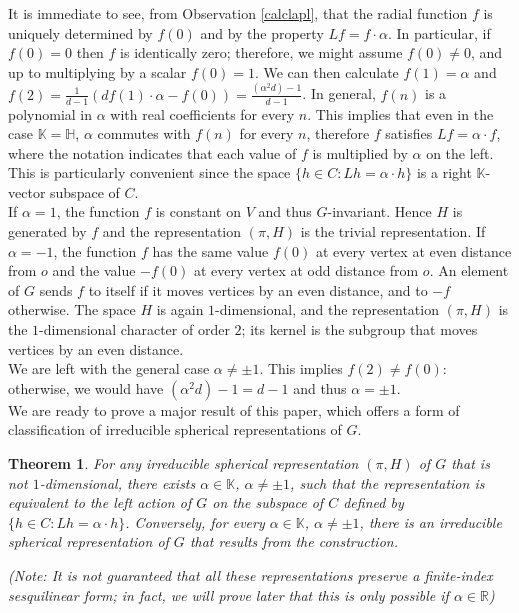 \documentclass{article}
\theoremstyle{definition}
\theoremstyle{remark}
\theoremstyle{plain}
\newtheorem{thm}[dfn]{Theorem}
\begin{document}
It is immediate to see, from Observation \ref{calclapl}, that the radial function $f$ is uniquely determined by $f(0)$ and by the property $Lf=f\cdot\alpha$. In particular, if $f(0)=0$ then $f$ is identically zero; therefore, we might assume $f(0)\neq 0$, and up to multiplying by a scalar $f(0)=1$. We can then calculate $f(1)=\alpha$ and $f(2)=\frac{1}{d-1}(df(1)\cdot\alpha-f(0))=\frac{(\alpha^2 d)-1}{d-1}$. In general, $f(n)$ is a polynomial in $\alpha$ with real coefficients for every $n$. This implies that even in the case $\mathbb{K}=\mathbb{H}$, $\alpha$ commutes with $f(n)$ for every $n$, therefore $f$ satisfies $Lf=\alpha\cdot f$, where the notation indicates that each value of $f$ is multiplied by $\alpha$ on the left. This is particularly convenient since the space $\{h\in C: Lh=\alpha\cdot h\}$ is a right $\mathbb{K}$-vector subspace of $C$.\\

If $\alpha=1$, the function $f$ is constant on $V$ and thus $G$-invariant. Hence $H$ is generated by $f$ and the representation $(\pi,H)$ is the trivial representation. If $\alpha=-1$, the function $f$ has the same value $f(0)$ at every vertex at even distance from $o$ and the value $-f(0)$ at every vertex at odd distance from $o$. An element of $G$ sends $f$ to itself if it moves vertices by an even distance, and to $-f$ otherwise. The space $H$ is again $1$-dimensional, and the representation $(\pi,H)$ is the $1$-dimensional character of order $2$; its kernel is the subgroup that moves vertices by an even distance. \\

We are left with the general case $\alpha\neq\pm 1$. This implies $f(2)\neq f(0)$: otherwise, we would have $(\alpha ^2 d)-1=d-1$ and thus $\alpha=\pm 1$. \\

We are ready to prove a major result of this paper, which offers a form of classification of irreducible spherical representations of $G$. \\

\begin{thm} \label{sph}
For any irreducible spherical representation $(\pi,H)$ of $G$ that is not $1$-dimensional, there exists $\alpha\in\mathbb{K}$, $\alpha\neq\pm 1$, such that the representation is equivalent to the left action of $G$ on the subspace of $C$ defined by $\{h\in C: Lh=\alpha\cdot h\}$. Conversely, for every $\alpha\in\mathbb{K}$, $\alpha\neq\pm 1$, there is an irreducible spherical representation of $G$ that results from the construction.

(Note: It is not guaranteed that all these representations preserve a finite-index sesquilinear form; in fact, we will prove later that this is only possible if $\alpha\in\mathbb{R}$)
\end{thm}
\end{document}

